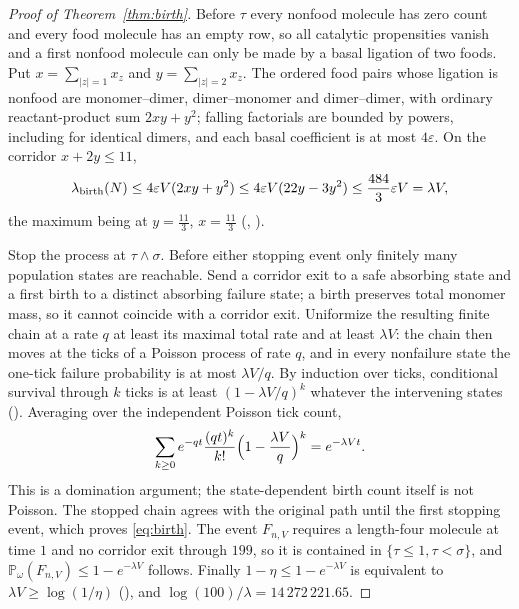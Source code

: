 \documentclass[11pt,letterpaper]{article}
\theoremstyle{plain}
\theoremstyle{definition}
\theoremstyle{remark}
\numberwithin{equation}{section}
\newcommand{\PP}{\mathbb P}
\newcommand{\eps}{\varepsilon}
\begin{document}
\begin{proof}[Proof of Theorem~\ref{thm:birth}]
Before $\tau$ every nonfood molecule has zero count and every food molecule has an empty row, so all catalytic propensities vanish and a first nonfood molecule can only be made by a basal ligation of two foods. Put $x=\sum_{|z|=1}x_z$ and $y=\sum_{|z|=2}x_z$. The ordered food pairs whose ligation is nonfood are monomer--dimer, dimer--monomer and dimer--dimer, with ordinary reactant-product sum $2xy+y^2$; falling factorials are bounded by powers, including for identical dimers, and each basal coefficient is at most $4\eps$. On the corridor $x+2y\le11$,
\begin{equation}\label{eq:hazard}
 \lambda_{\rm birth}(N)\le4\eps V(2xy+y^2)\le4\eps V(22y-3y^2)\le\frac{484}3\eps V=\lambda V,
\end{equation}
the maximum being at $y=\tfrac{11}3$, $x=\tfrac{11}3$ (, ).

Stop the process at $\tau\wedge\sigma$. Before either stopping event only finitely many population states are reachable. Send a corridor exit to a safe absorbing state and a first birth to a distinct absorbing failure state; a birth preserves total monomer mass, so it cannot coincide with a corridor exit. Uniformize the resulting finite chain at a rate $q$ at least its maximal total rate and at least $\lambda V$: the chain then moves at the ticks of a Poisson process of rate $q$, and in every nonfailure state the one-tick failure probability is at most $\lambda V/q$. By induction over ticks, conditional survival through $k$ ticks is at least $(1-\lambda V/q)^k$ whatever the intervening states (). Averaging over the independent Poisson tick count,
\begin{equation}\label{eq:mixture}
 \sum_{k\ge0}e^{-qt}\frac{(qt)^k}{k!}\Bigl(1-\frac{\lambda V}q\Bigr)^k=e^{-\lambda Vt}.
\end{equation}
This is a domination argument; the state-dependent birth count itself is not Poisson. The stopped chain agrees with the original path until the first stopping event, which proves \eqref{eq:birth}. The event $F_{n,V}$ requires a length-four molecule at time $1$ and no corridor exit through $199$, so it is contained in $\{\tau\le1,\tau<\sigma\}$, and $\PP_\omega(F_{n,V})\le1-e^{-\lambda V}$ follows. Finally $1-\eta\le1-e^{-\lambda V}$ is equivalent to $\lambda V\ge\log(1/\eta)$ (), and $\log(100)/\lambda=14\,272\,221.65$.
\end{proof}
\end{document}
